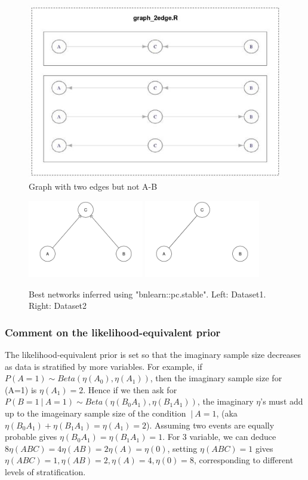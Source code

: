 \documentclass[]{article}
\newcommand\gvn[1][]{\:#1\vert\:}
\theoremstyle{definition}
\theoremstyle{definition}
\theoremstyle{definition}
\theoremstyle{remark}
\begin{document}
\begin{figure}
\centering
\includegraphics[height=0.50000\textwidth]{graph_2edge.jpg}
\caption{Graph with two edges but not A-B}
\end{figure}

\begin{figure}
\includegraphics[width=0.45\textwidth]{pcalgo_dat1.png}
\includegraphics[width=0.45\textwidth]{pcalgo_dat2.png}
\caption{ \label{fig:pc-best}Best networks inferred using "bnlearn::pc.stable". Left: Dataset1. Right: Dataset2}
\end{figure}

\subsubsection{Comment on the likelihood-equivalent
prior}\label{comment-on-the-likelihood-equivalent-prior}

The likelihood-equivalent prior is set so that the imaginary sample size
decreases as data is stratified by more variables. For example, if
\(P(A=1) \sim Beta(\eta(A_0),\eta(A_1))\), then the imaginary sample
size for (A=1) is \(\eta(A_1)=2\). Hence if we then ask for
\(P(B=1\gvn A=1)\sim Beta(\eta(B_0A_1),\eta(B_1A_1))\), the imaginary
\(\eta\)'s must add up to the imageinary sample size of the condition
\(\gvn A=1\), (aka \(\eta(B_0A_1)+\eta(B_1A_1)=\eta(A_1)=2\)). Assuming
two events are equally probable gives \(\eta(B_0A_1)=\eta(B_1A_1)=1\).
For 3 variable, we can deduce \(8\eta(ABC)=4\eta(AB)=2\eta(A)=\eta(0)\),
setting \(\eta(ABC)=1\) gives
\(\eta(ABC)=1,\eta(AB)=2,\eta(A)=4,\eta(0)=8\), corresponding to
different levels of stratification.
\end{document}

